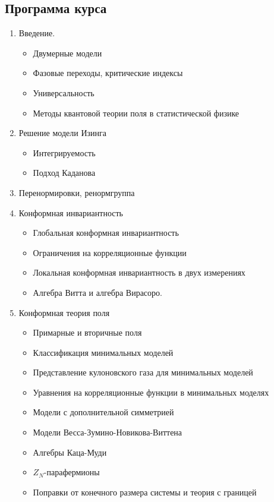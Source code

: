 \documentclass[a4paper,12pt]{article}
\theoremstyle{definition}
\theoremstyle{definition}
\theoremstyle{definition}
\begin{document}
\subsection{Программа курса}
\label{sec:program}
\begin{enumerate}
\item Введение.
  \begin{itemize}
  \item Двумерные модели
  \item Фазовые переходы, критические индексы
  \item Универсальность
  \item Методы квантовой теории поля в статистической физике
  \end{itemize}
\item Решение модели Изинга
  \begin{itemize}
  \item Интегрируемость
  \item Подход Каданова
  \end{itemize}
\item Перенормировки, ренормгруппа
\item Конформная инвариантность
  \begin{itemize}
  \item Глобальная конформная инвариантность
  \item Ограничения на корреляционные функции
  \item Локальная конформная инвариантность в двух измерениях
  \item Алгебра Витта и алгебра Вирасоро.
  \end{itemize}
\item Конформная теория поля
  \begin{itemize}
  \item Примарные и вторичные поля
  \item Классификация минимальных моделей
  \item Представление кулоновского газа для минимальных моделей
  \item Уравнения на корреляционные функции в минимальных моделях
  \item Модели с дополнительной симметрией
  \item Модели Весса-Зумино-Новикова-Виттена
  \item Алгебры Каца-Муди
  \item $Z_{N}$-парафермионы
  \item Поправки от конечного размера системы и теория с границей

  \end{itemize}
\end{enumerate}
\end{document}
